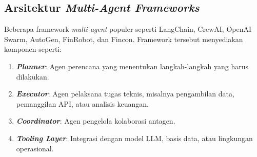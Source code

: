 \subsection{Arsitektur \textit{Multi-Agent Frameworks}}
Beberapa framework \textit{multi-agent} populer seperti LangChain, CrewAI, OpenAI Swarm, AutoGen, FinRobot, dan Fincon. Framework tersebut menyediakan komponen seperti:
\begin{enumerate}
    \item \textbf{\textit{Planner}}: Agen perencana yang menentukan langkah-langkah yang harus dilakukan.
    \item \textbf{\textit{Executor}}: Agen pelaksana tugas teknis, misalnya pengambilan data, pemanggilan API, atau analisis keuangan.
    \item \textbf{\textit{Coordinator}}: Agen pengelola kolaborasi antagen.
    \item \textbf{\textit{Tooling Layer}}: Integrasi dengan model LLM, basis data, atau lingkungan operasional.
\end{enumerate}





